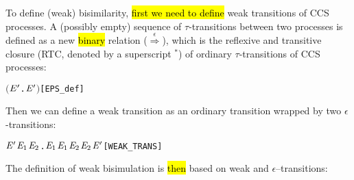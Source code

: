 To define (weak) bisimilarity, \hl{first we need to define}
weak transitions of CCS processes.
A (possibly empty) sequence of $\tau$-transitions between
two processes is defined as a new \hl{binary} relation 
($\overset{\epsilon}{\Longrightarrow}$), which is the
reflexive and transitive closure (RTC, denoted by a superscript $^*$)
of ordinary $\tau$-transitions of CCS processes:
\begin{alltt}
    \HOLTokenDefEquality{} \ensuremath{(}\HOLTokenLambda{} \ensuremath{\HOLBoundVar{E}\sp{\prime}}.  \HOLTokenTransBegin\HOLSymConst{\ensuremath{\tau}}\HOLTokenTransEnd \ensuremath{\HOLBoundVar{E}\sp{\prime}}\ensuremath{)}\HOLSymConst{\HOLTokenSupStar{}}\hfill{[EPS_def]}
\end{alltt}
Then we can define a weak transition as an ordinary transition wrapped by
two $\epsilon$-transitions:
\begin{alltt}
    \HOLTokenWeakTransBegin{}\HOLTokenWeakTransEnd \ensuremath{\HOLFreeVar{E}\sp{\prime}} \HOLTokenDefEquality{} \HOLSymConst{\HOLTokenExists{}}\ensuremath{\HOLBoundVar{E}\sb{\mathrm{1}}} \ensuremath{\HOLBoundVar{E}\sb{\mathrm{2}}}.  \HOLSymConst{\HOLTokenEPS} \ensuremath{\HOLBoundVar{E}\sb{\mathrm{1}}} \HOLSymConst{\HOLTokenConj{}} \ensuremath{\HOLBoundVar{E}\sb{\mathrm{1}}} \HOLTokenTransBegin{}\HOLTokenTransEnd \ensuremath{\HOLBoundVar{E}\sb{\mathrm{2}}} \HOLSymConst{\HOLTokenConj{}} \ensuremath{\HOLBoundVar{E}\sb{\mathrm{2}}} \HOLSymConst{\HOLTokenEPS} \ensuremath{\HOLFreeVar{E}\sp{\prime}}\hfill{[WEAK_TRANS]}
\end{alltt}
%
The definition of weak bisimulation is \hl{then} based on weak and $\epsilon$--transitions:
